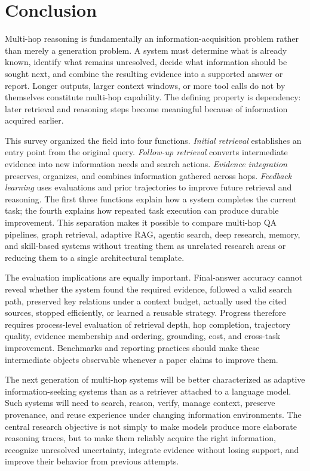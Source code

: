 \section{Conclusion}
\label{sec:conclusion}

Multi-hop reasoning is fundamentally an information-acquisition problem rather than merely a generation problem. A system must determine what is already known, identify what remains unresolved, decide what information should be sought next, and combine the resulting evidence into a supported answer or report. Longer outputs, larger context windows, or more tool calls do not by themselves constitute multi-hop capability. The defining property is dependency: later retrieval and reasoning steps become meaningful because of information acquired earlier.

This survey organized the field into four functions. \emph{Initial retrieval} establishes an entry point from the original query. \emph{Follow-up retrieval} converts intermediate evidence into new information needs and search actions. \emph{Evidence integration} preserves, organizes, and combines information gathered across hops. \emph{Feedback learning} uses evaluations and prior trajectories to improve future retrieval and reasoning. The first three functions explain how a system completes the current task; the fourth explains how repeated task execution can produce durable improvement. This separation makes it possible to compare multi-hop QA pipelines, graph retrieval, adaptive RAG, agentic search, deep research, memory, and skill-based systems without treating them as unrelated research areas or reducing them to a single architectural template.

The evaluation implications are equally important. Final-answer accuracy cannot reveal whether the system found the required evidence, followed a valid search path, preserved key relations under a context budget, actually used the cited sources, stopped efficiently, or learned a reusable strategy. Progress therefore requires process-level evaluation of retrieval depth, hop completion, trajectory quality, evidence membership and ordering, grounding, cost, and cross-task improvement. Benchmarks and reporting practices should make these intermediate objects observable whenever a paper claims to improve them.

The next generation of multi-hop systems will be better characterized as adaptive information-seeking systems than as a retriever attached to a language model. Such systems will need to search, reason, verify, manage context, preserve provenance, and reuse experience under changing information environments. The central research objective is not simply to make models produce more elaborate reasoning traces, but to make them reliably acquire the right information, recognize unresolved uncertainty, integrate evidence without losing support, and improve their behavior from previous attempts.
